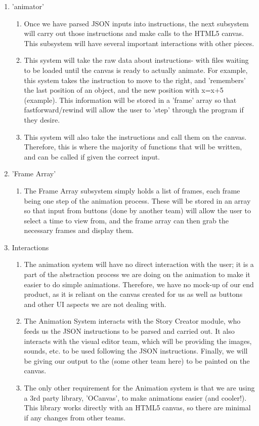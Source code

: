 \documentclass[12pt]{article}
\begin{document}
\begin{enumerate}
\begin{enumerate}
\end{enumerate}
\item 'animator'
\begin{enumerate}
\item Once we have parsed JSON inputs into instructions, the next subsystem will carry out those instructions and make calls to the HTML5 canvas. This subsystem will have several important interactions with other pieces.
\item This system will take the raw data about instructions- with files waiting to be loaded until the canvas is ready to actually animate. For example, this system takes the instruction to move to the right, and 'remembers' the last position of an object, and the new position with x=x+5 (example). This information will be stored in a 'frame' array so that fastforward/rewind will allow the user to 'step' through the program if they desire.
\item This system will also take the instructions and call them on the canvas. Therefore, this is where the majority of functions that will be written, and can be called if given the correct input.
\end{enumerate}

\item 'Frame Array'
\begin{enumerate}
\item The Frame Array subsystem simply holds a list of frames, each frame being one step of the animation process. These will be stored in an array so that input from buttons (done by another team) will allow the user to select a time to view from, and the frame array can then grab the necessary frames and display them. 
\end{enumerate}

\item Interactions
\begin{enumerate}
\item The animation system will have no direct interaction with the user; it is a part of the abstraction process we are doing on the animation to make it easier to do simple animations. Therefore, we have no mock-up of our end product, as it is reliant on the canvas created for us as well as buttons and other UI aspects we are not dealing with.
\item The Animation System interacts with the Story Creator module, who feeds us the JSON instructions to be parsed and carried out. It also interacts with the visual editor team, which will be providing the images, sounds, etc. to be used following the JSON instructions. Finally, we will be giving our output to the (some other team here) to be painted on the canvas.
\item The only other requirement for the Animation system is that we are using a 3rd party library, 'OCanvas', to make animations easier (and cooler!). This library works directly with an HTML5 canvas, so there are minimal if any changes from other teams.

\end{enumerate}



  \end{enumerate}

	
\end{document}
